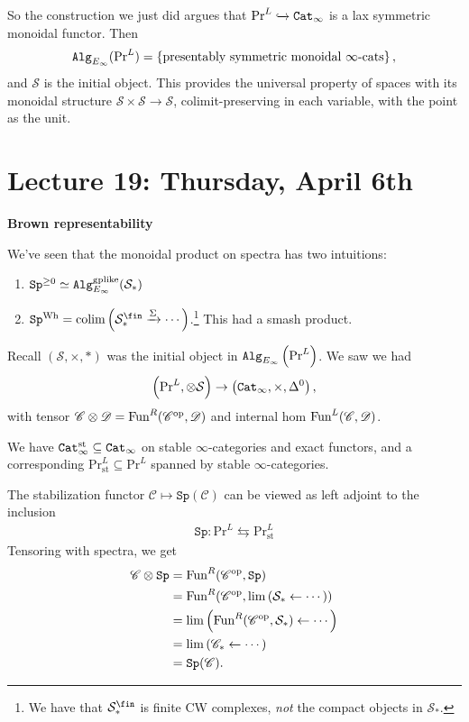 \documentclass[12pt]{amsart}
\theoremstyle{definition}
\providecommand{\Sp}{\texttt{Sp}}
\providecommand{\Sp}{\text{Sp}}
\providecommand{\st}{\text{st}}
\providecommand{\Pr}{\text{Pr}}
\begin{document}
So the construction we just did argues that $\Pr^L \hookto \Cat_\infty$ is a lax symmetric monoidal functor. Then
\begin{align*}
    \Alg_{E_\infty}(\Pr^L) = \left\{ \text{presentably symmetric monoidal } \infty\text{-cats} \right\},
\end{align*}
and $\mathcal{S}$ is the initial object. This provides the universal property of spaces with its monoidal structure $\mathcal{S} \times \mathcal{S} \to \mathcal{S}$, colimit-preserving in each variable, with the point as the unit.


\section{Lecture 19: Thursday, April 6th}

\begin{center}
    \textbf{Brown representability}
\end{center}

We've seen that the monoidal product on spectra has two intuitions:
\begin{enumerate}
    \item $\Sp^{\ge 0} \simeq \Alg_{E_\infty}^\text{gplike}(\mathcal{S}_\ast)$
    \item $\Sp^\text{Wh} = \colim \left( \mathcal{S}_\ast^\fin \xto{\Sigma} \cdots \right)$.\footnote{We have that $\mathcal{S}_\ast^\fin$ is finite CW complexes, \textit{not} the compact objects in $\mathcal{S}_\ast$.} This had a smash product.
\end{enumerate}

Recall $\left( \mathcal{S}, \times, \ast \right)$ was the initial object in $\Alg_{E_\infty}\left( \Pr^L \right)$. We saw we had
\begin{align*}
    \left( \Pr^L, \otimes \mathcal{S} \right) \to \left( \Cat_\infty, \times, \Delta^0 \right),
\end{align*}
with tensor $\mathscr{C} \otimes \mathscr{D} = \text{Fun}^R(\mathscr{C}^{\text{op}}, \mathscr{D})$ and internal hom $\text{Fun}^L(\mathscr{C},\mathscr{D})$.

We have $\Cat_\infty^\st \subseteq \Cat_\infty$ on stable $\infty$-categories and exact functors, and a corresponding $\Pr^L_\st \subseteq \Pr^L$ spanned by stable $\infty$-categories.

The stabilization functor $\mathscr{C} \mapsto \Sp(\mathscr{C})$ can be viewed as left adjoint to the inclusion
\begin{align*}
    \Sp: \Pr^L \leftrightarrows \Pr^L_\st
\end{align*}
Tensoring with spectra, we get
\begin{align*}
    \mathscr{C} \otimes \Sp &= \Fun^R(\mathscr{C}^\op, \Sp) \\
    &= \Fun^R(\mathscr{C}^\op, \lim \left( \mathcal{S}_\ast \from \cdots \right)) \\
    &= \lim \left( \Fun^R(\mathscr{C}^\op, \mathcal{S}_\ast) \from \cdots \right) \\
    &= \lim \left( \mathscr{C}_\ast \from \cdots \right) \\
    &= \Sp(\mathscr{C}).
\end{align*}
\end{document}
